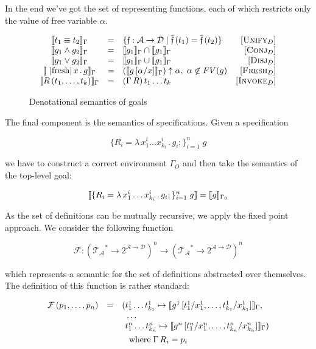 In the end we've got the set of representing functions, each of which restricts only the value of free variable $\alpha$. 

\begin{figure}[t]
  \[
  \begin{array}{cclr}
    \sembr{t_1\equiv t_2}_\Gamma&=&\{\mathfrak f : \mathcal{A}\to\mathcal{D}\mid \overline{\mathfrak{f}}\,(t_1)=\overline{\mathfrak{f}}\,(t_2)\}& \mbox{[\textsc{Unify$_D$}]}\\
    \sembr{g_1\wedge g_2}_\Gamma&=&\sembr{g_1}_\Gamma\cap\sembr{g_1}_\Gamma&\mbox{[\textsc{Conj$_D$}]}\\
    \sembr{g_1\vee g_2}_\Gamma&=&\sembr{g_1}_\Gamma\cup\sembr{g_1}_\Gamma&\mbox{[\textsc{Disj$_D$}]}\\
    \sembr{\mbox{\lstinline|fresh|}\,x\,.\,g}_\Gamma&=&(\sembr{g\,[\alpha/x]}_\Gamma)\uparrow\alpha,\;\alpha\not\in FV(g)& \mbox{[\textsc{Fresh$_D$}]}\\
    \sembr{R\,(t_1,\dots,t_k)}_\Gamma&=&(\Gamma\,R)\,t_1\dots t_k & \mbox{[\textsc{Invoke$_D$}]}
  \end{array}
  \]
  \caption{Denotational semantics of goals}
  \label{denotational_semantics_of_goals}
\end{figure}

The final component is the semantics of specifications. Given a specification

\[
\{R_i=\lambda\,x_1^i\dots x_{k_i}^i\,.\,g_i;\}_{i=1}^n\;g
\]

we have to construct a correct environment $\Gamma_O$ and then take the semantics of the top-level goal:

\[
\llbracket{\{R_i=\lambda\,x_1^i\dots x_{k_i}^i\,.\,g_i;\}_{i=1}^n\;g}\rrbracket=\llbracket{g}\rrbracket_{\Gamma_0}
\]

As the set of definitions can be mutually recursive, we apply the fixed point approach. We consider the following
function

\[
\mathcal{F} : (\mathcal{T_A}^*\to 2^{\mathcal{A}\to\mathcal{D}})^n\to (\mathcal{T_A}^*\to 2^{\mathcal{A}\to\mathcal{D}})^n
\]

which represents a semantic for the set of definitions abstracted over themselves. The definition of this function is
rather standard:

\begin{gather*}
    \begin{array}{rcl}
      \mathcal{F}\,(p_1,\dots,p_n)& = &(t^1_1\dots t^1_{k_1}\mapsto\llbracket{g^1\,[t^1_1/x^1_1,\dots,t^1_{k_1}/x^1_{k_1}]}\rrbracket_\Gamma,\\
                                  &  &\phantom{(}\dots\\
                                  &  &\phantom{(}t^n_1\dots t^n_{k_n}\mapsto\llbracket{g^n\,[t^n_1/x^n_1,\dots,t^n_{k_n}/x^n_{k_n}]}\rrbracket_\Gamma)
    \end{array}\\
    \mbox{where}\;\Gamma\, R_i=p_i
\end{gather*}

